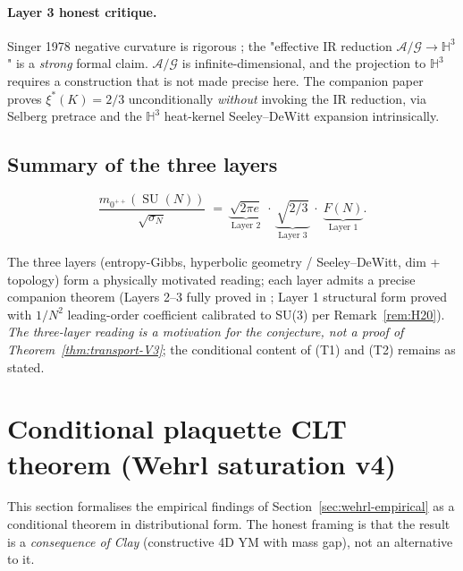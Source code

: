 \documentclass[11pt,a4paper,reqno]{amsart}
\theoremstyle{definition}
\DeclareMathOperator{\SU}{SU}
\newcommand{\HH}{\mathbb{H}}
\newcommand{\xis}{\xi^{*}}
\begin{document}
\paragraph{Layer 3 honest critique.}
Singer 1978 negative curvature is rigorous \cite{Singer1978}; the
"effective IR reduction $\mathcal{A}/\mathcal{G}\to\HH^3$" is a
\emph{strong} formal claim. $\mathcal{A}/\mathcal{G}$ is
infinite-dimensional, and the projection to $\HH^3$ requires a
construction that is not made precise here. The companion paper
\cite{Remondiere2026CR} proves $\xis(K) = 2/3$ unconditionally
\emph{without} invoking the IR reduction, via Selberg pretrace and
the $\HH^3$ heat-kernel Seeley--DeWitt expansion intrinsically.

\subsection{Summary of the three layers}\label{ss:layer-summary}

\begin{equation}\label{eq:three-layer}
\boxed{
\frac{m_{0^{++}}(\SU(N))}{\sqrt{\sigma_N}}
\;=\;
\underbrace{\sqrt{2\pi e}}_{\text{Layer 2}}\;\cdot\;
\underbrace{\sqrt{2/3}}_{\text{Layer 3}}\;\cdot\;
\underbrace{F(N)}_{\text{Layer 1}}.}
\end{equation}

The three layers (entropy-Gibbs, hyperbolic geometry / Seeley--DeWitt,
dim + topology) form a physically motivated reading; each layer
admits a precise companion theorem (Layers 2--3 fully proved in
\cite{Remondiere2026CR,Remondiere2026RouteB}; Layer 1 structural
form proved with $1/N^2$ leading-order coefficient calibrated to
SU(3) per Remark~\ref{rem:H20}). \emph{The three-layer reading is a
motivation for the conjecture, not a proof of
Theorem~\ref{thm:transport-V3}}; the conditional content of (T1)
and (T2) remains as stated.

\section{Conditional plaquette CLT theorem (Wehrl saturation v4)}\label{sec:plaquette-clt}

This section formalises the empirical findings of Section~\ref{sec:wehrl-empirical}
as a conditional theorem in distributional form. The honest framing is that the result
is a \emph{consequence of Clay} (constructive 4D YM with mass gap), not an alternative to it.
\end{document}
